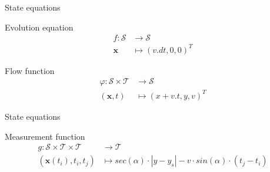 \documentclass{beamer}
\begin{document}
            \begin{frame}{State equations}
                \begin{block}{Evolution equation}
                    \begin{equation}
                        \begin{aligned}
                            f\colon \mathcal{S} &\to \mathcal{S} \\
                            \mathbf{x} &\mapsto (v.dt, 0, 0)^T
                        \end{aligned}
                    \end{equation}
                \end{block}
                \begin{block}{Flow function}
                    \begin{equation}
                        \begin{aligned}
                            \varphi\colon \mathcal{S} \times \mathcal{T} &\to \mathcal{S} \\
                            (\mathbf{x}, t) &\mapsto (x + v.t, y, v)^T
                        \end{aligned}
                    \end{equation}
                \end{block}
            \end{frame}

            \begin{frame}{State equations}
                \begin{block}{Measurement function}
                    \begin{equation}
                        \begin{aligned}
                            g\colon \mathcal{S} \times \mathcal{T} \times \mathcal{T} &\to \mathcal{T} \\
                            (\mathbf{x}(t_i), t_i, t_j) &\mapsto sec(\alpha) \cdot |y - y_s| - v \cdot sin(\alpha) \cdot (t_j - t_i)
                        \end{aligned}
                    \end{equation}
                \end{block}
            \end{frame}
\end{document}
